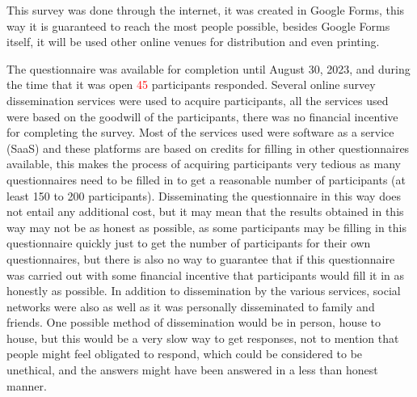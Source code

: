 This survey was done through the internet, it was created in Google Forms,
this way it is guaranteed to reach the most people possible, besides Google
Forms itself, it will be used other online venues for distribution and even
printing.

The questionnaire was available for completion until August 30, 2023,
and during the time that it was open \textcolor{red}{45} participants responded.
Several online survey dissemination services were used to acquire participants,
all the services used were based on the goodwill of the participants, there
was no financial incentive for completing the survey. Most of the services
used were software as a service (SaaS) and  these platforms are based
on credits for filling in other questionnaires available, this makes the process
of acquiring participants very tedious as many questionnaires need to be
filled in to get a reasonable number of participants (at least 150 to
200 participants). Disseminating the questionnaire in this way does not
entail any additional cost, but it may mean that the results obtained
in this way may not be as honest as possible, as some participants may
be filling in this questionnaire quickly just to get the number of participants
for their own questionnaires, but there is also no way to guarantee that
if this questionnaire was carried out with some financial incentive that
participants would fill it in as honestly as possible. In addition to
dissemination by the various services, social networks were also as well
as it was personally disseminated to family and friends. One possible
method of dissemination would be in person, house to house,
but this would be a very slow way to get responses, not to mention that
people might feel obligated to respond, which could be considered to be
unethical, and the answers might have been answered in a less than
honest manner.

